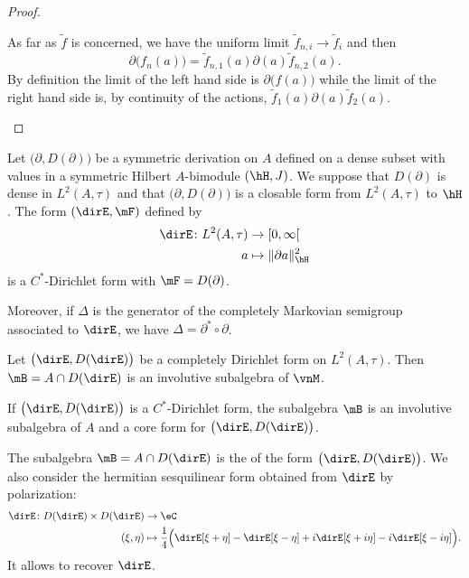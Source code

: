 \begin{proof}
\begin{enumerate}
            As far as \( \tilde f\) is concerned, we have the uniform limit \( \tilde f_{n,i}\to\tilde f_i\) and then
            \begin{equation}
                \partial\big( f_n(a) \big)=\tilde f_{n,1}(a)\partial(a)\tilde f_{n,2}(a).
            \end{equation}
            By definition the limit of the left hand side is \( \partial\big( f(a) \big)\) while the limit of the right hand side is, by continuity of the actions, \( \tilde f_1(a)\partial(a)\tilde f_2(a)\).
            
    \end{enumerate}
    
\end{proof}

\begin{theorem}
	Let $\big( \partial,D(\partial) \big)$ be a symmetric derivation on $A$ defined on a dense subset with values in a symmetric Hilbert $A$-bimodule $(\hH,J)$. We suppose that $D(\partial)$ is dense in $L^2(A,\tau)$ and that $\big( \partial,D(\partial) \big)$ is a closable form from $L^2(A,\tau)$ to $\hH$. The form $(\dirE,\mF)$ defined by
	\begin{equation}
		\begin{aligned}
			\dirE\colon L^2(A,\tau)&\to \mathopen[ 0 , \infty [ \\
			a&\mapsto \| \partial a \|^2_{\hH} 
		\end{aligned}
	\end{equation}
	is  a $C^*$-Dirichlet form with $\mF=D(\partial)$.

	Moreover, if $\Delta$ is the generator of the completely Markovian semigroup associated to $\dirE$, we have $\Delta=\partial^*\circ \partial$.
\end{theorem}

\begin{proposition}
	Let $\big( \dirE,D(\dirE) \big)$ be a completely Dirichlet form on $L^2(A,\tau)$. Then $\mB=A\cap D(\dirE)$ is an involutive subalgebra of $\vnM$.

	If $\big( \dirE,D(\dirE) \big)$ is a $C^*$-Dirichlet form, the subalgebra $\mB$ is an involutive subalgebra of $A$ and a core form for $\big( \dirE,D(\dirE) \big)$.
\end{proposition}

The subalgebra $\mB=A\cap D(\dirE)$ is the  of the form $\big( \dirE,D(\dirE) \big)$. We also consider the hermitian sesquilinear form obtained from \(\dirE\) by polarization:
\begin{equation}
    \begin{aligned}
        \dirE\colon D(\dirE)\times D(\dirE)&\to \eC \\
        (\xi,\eta)&\mapsto \frac{1}{ 4 }\Big( \dirE[\xi+\eta]-\dirE[\xi-\eta]+i\dirE[\xi+i\eta]-i\dirE[\xi-i\eta]  \Big).
    \end{aligned}
\end{equation}
It allows to recover \(\dirE\).

